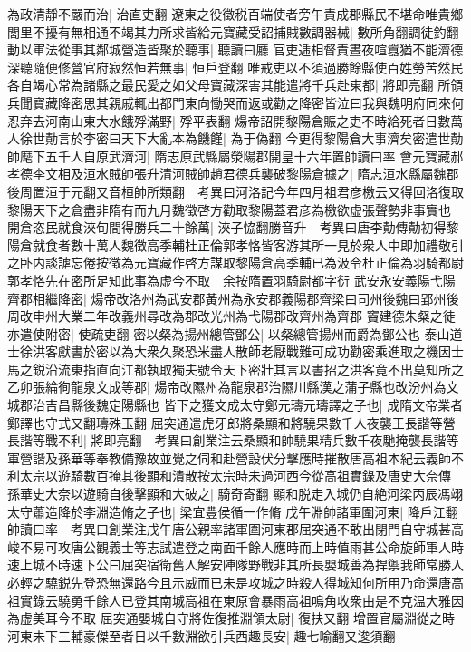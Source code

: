 為政清靜不嚴而治|{
	治直吏翻}
遼東之役徵税百端使者旁午責成郡縣民不堪命唯貴鄉閭里不擾有無相通不竭其力所求皆給元寶藏受詔捕賊數調器械|{
	數所角翻調徒釣翻}
動以軍法從事其鄰城營造皆聚於聽事|{
	聽讀曰廳}
官吏逓相督責晝夜喧囂猶不能濟德深聽隨便修營官府寂然恒若無事|{
	恒戶登翻}
唯戒吏以不須過勝餘縣使百姓勞苦然民各自竭心常為諸縣之最民愛之如父母寶藏深害其能遣將千兵赴東都|{
	將即亮翻}
所領兵聞寶藏降密思其親戚輒出都門東向慟哭而返或勸之降密皆泣曰我與魏明府同來何忍弃去河南山東大水餓殍滿野|{
	殍平表翻}
煬帝詔開黎陽倉賑之吏不時給死者日數萬人徐世勣言於李密曰天下大亂本為饑饉|{
	為于偽翻}
今更得黎陽倉大事濟矣密遣世勣帥麾下五千人自原武濟河|{
	隋志原武縣屬滎陽郡開皇十六年置帥讀曰率}
會元寶藏郝孝德李文相及洹水賊帥張升清河賊帥趙君德兵襲破黎陽倉據之|{
	隋志洹水縣屬魏郡後周置洹于元翻又音桓帥所類翻　考異曰河洛記今年四月祖君彦檄云又得回洛復取黎陽天下之倉盡非隋有而九月魏徵啓方勸取黎陽蓋君彦為檄欲虚張聲勢非事實也}
開倉恣民就食浹旬間得勝兵二十餘萬|{
	浹子恊翻勝音升　考異曰唐李勣傳勣初得黎陽倉就食者數十萬人魏徵高季輔杜正倫郭孝恪皆客游其所一見於衆人中即加禮敬引之卧内談謔忘倦按徵為元寶藏作啓方謀取黎陽倉高季輔已為汲令杜正倫為羽騎都尉郭孝恪先在密所足知此事為虚今不取　余按隋置羽騎尉都字衍}
武安永安義陽弋陽齊郡相繼降密|{
	煬帝改洛州為武安郡黃州為永安郡義陽郡齊梁曰司州後魏曰郢州後周改申州大業二年改義州尋改為郡改光州為弋陽郡改齊州為齊郡}
竇建德朱粲之徒亦遣使附密|{
	使疏吏翻}
密以粲為揚州總管鄧公|{
	以粲總管揚州而爵為鄧公也}
泰山道士徐洪客獻書於密以為大衆久聚恐米盡人散師老厭戰難可成功勸密乘進取之機因士馬之鋭沿流東指直向江都執取獨夫號令天下密壯其言以書招之洪客竟不出莫知所之　乙卯張綸徇龍泉文成等郡|{
	煬帝改隰州為龍泉郡治隰川縣漢之蒲子縣也改汾州為文城郡治吉昌縣後魏定陽縣也}
皆下之獲文成太守鄭元璹元璹譯之子也|{
	成隋文帝業者鄭譯也守式又翻璹殊玉翻}
屈突通遣虎牙郎將桑顯和將驍果數千人夜襲王長諧等營長諧等戰不利|{
	將即亮翻　考異曰創業注云桑顯和帥驍果精兵數千夜馳掩襲長諧等軍營諧及孫華等奉教備豫故並覺之伺和赴營設伏分擊應時摧散唐高祖本紀云義師不利太宗以遊騎數百掩其後顯和潰散按太宗時未過河西今從高祖實錄及唐史大奈傳}
孫華史大奈以遊騎自後擊顯和大破之|{
	騎奇寄翻}
顯和脱走入城仍自絶河梁丙辰馮翊太守蕭造降於李淵造脩之子也|{
	梁宜豐侯循一作脩}
戊午淵帥諸軍圍河東|{
	降戶江翻帥讀曰率　考異曰創業注戊午唐公親率諸軍圍河東郡屈突通不敢出閉門自守城甚高峻不易可攻唐公觀義士等志試遣登之南面千餘人應時而上時值雨甚公命旋師軍人時速上城不時速下公曰屈突宿衛舊人解安陣隊野戰非其所長嬰城善為捍禦我師常勝入必輕之驍鋭先登恐無還路今且示威而已未是攻城之時殺人得城知何所用乃命還唐高祖實錄云驍勇千餘人已登其南城高祖在東原會暴雨高祖鳴角收衆由是不克温大雅因為虚美耳今不取}
屈突通嬰城自守將佐復推淵領太尉|{
	復扶又翻}
增置官屬淵從之時河東未下三輔豪傑至者日以千數淵欲引兵西趣長安|{
	趣七喻翻又逡須翻}
